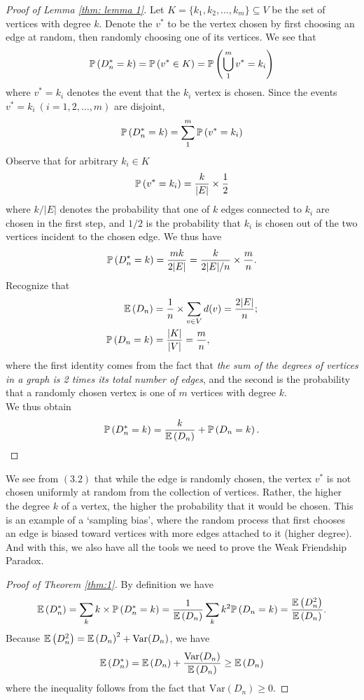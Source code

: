 \documentclass[12pt,reqno, a4]{amsart}
\begin{document}
\begin{proof}[Proof of Lemma \ref{thm: lemma 1}]
    Let $K = \{k_1, k_2, \dots, k_m\} \subseteq V$ be the set of vertices with degree $k$. Denote the $v^*$ to be the vertex chosen by first choosing an edge at random, then randomly choosing one of its vertices. We see that 
    \[
    \mathbb{P}\left (D_n^* = k \right) = \mathbb{P}\left (v^* \in K \right) = \mathbb{P}\left (\bigcup_{1}^m v^* = k_i \right) 
    \]
    where $v^* = k_i$ denotes the event that the $k_i$ vertex is chosen. Since the events $v^* = k_i \ (i = 1, 2, \dots, m)$ are disjoint,
    \[
    \mathbb{P}\left (D_n^* = k \right) = \sum_{1}^m \mathbb{P}\left (v^* = k_i \right)
    \]
    Observe that for arbitrary $k_i \in K$ 
    \[
    \mathbb{P}\left (v^* = k_i \right) = \frac{k}{|E|} \times \frac{1}{2}
    \]
    where $k/|E|$ denotes the probability that one of $k$ edges connected to $k_i$ are chosen in the first step, and $1/2$ is the probability that $k_i$ is chosen out of the two vertices incident to the chosen edge. We thus have
    \[
    \mathbb{P}\left (D_n^* = k \right) = \frac{mk}{2|E|} = \frac{k}{2|E|/n} \times \frac{m}{n}.
    \]
    Recognize that \begin{align*}
        \mathbb{E}\left( D_n \right) &= \frac{1}{n} \times \sum_{v \in V} d(v) = \frac{2|E|}{n};\\
        \mathbb{P}\left (D_n = k \right) &= \frac{|K|}{|V|} = \frac{m}{n},
    \end{align*}
    where the first identity comes from the fact that \textit{the sum of the degrees of vertices in a graph is 2 times its total number of edges}, and the second is the probability that a randomly chosen vertex is one of $m$ vertices with degree $k$.\\
    We thus obtain
    \[
    \mathbb{P}\left (D_n^* = k \right) = \frac{k}{\mathbb{E}\left( D_n \right)} + \mathbb{P}\left (D_n = k \right).
    \]
\end{proof}
    We see from $(3.2)$ that while the edge is randomly chosen, the vertex $v^*$ is not chosen uniformly at random from the collection of vertices. Rather, the higher the degree $k$ of a vertex, the higher the probability that it would be chosen. This is an example of a `sampling bias', where the random process that first chooses an edge is biased toward vertices with more edges attached to it (higher degree). And with this, we also have all the tools we need to prove the Weak Friendship Paradox.
\begin{proof}[Proof of Theorem \ref{thm:1}]
    By definition we have \[
\mathbb{E}\left( D_n^* \right) = \sum_k k \times \mathbb{P}\left (D_n^* = k \right) = \frac{1}{\mathbb{E}\left( D_n \right)} \sum_k k^2 \mathbb{P}\left (D_n = k \right) = \frac{\mathbb{E}\left( D_n^2 \right)}{\mathbb{E}\left( D_n \right)}.
\]
Because $\mathbb{E}\left( D_n^2 \right) = \mathbb{E}\left( D_n \right)^2 + \text{Var}(D_n)$, we have
\[
\mathbb{E}\left( D_n^* \right) = \mathbb{E}\left( D_n \right) + \frac{\text{Var}(D_n)}{\mathbb{E}\left( D_n \right)} \geq \mathbb{E}\left( D_n \right)
\]
where the inequality follows from the fact that $\text{Var}(D_n) \geq 0$.
\end{proof}
\end{document}
